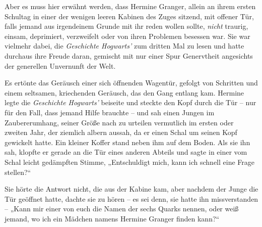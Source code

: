 Aber es muss hier erwähnt werden, dass Hermine Granger, allein an ihrem ersten Schultag in einer der wenigen leeren Kabinen des Zuges sitzend, mit offener Tür, falls jemand aus irgendeinem Grunde mit ihr reden wollen sollte, \emph{nicht} traurig, einsam, deprimiert, verzweifelt oder von ihren Problemen besessen war. Sie war vielmehr dabei, die \emph{Geschichte Hogwarts’} zum dritten Mal zu lesen und hatte durchaus ihre Freude daran, gemischt mit nur einer Spur Genervtheit angesichts der generellen Unvernunft der Welt.

Es ertönte das Geräusch einer sich öffnenden Wagentür, gefolgt von Schritten und einem seltsamen, kriechenden Geräusch, das den Gang entlang kam. Hermine legte die \emph{Geschichte Hogwarts’} beiseite und steckte den Kopf durch die Tür – nur für den Fall, dass jemand Hilfe brauchte – und sah einen Jungen im Zaubererumhang, seiner Größe nach zu urteilen vermutlich im ersten oder zweiten Jahr, der ziemlich albern aussah, da er einen Schal um seinen Kopf gewickelt hatte. Ein kleiner Koffer stand neben ihm auf dem Boden. Als sie ihn sah, klopfte er gerade an die Tür eines anderen Abteils und sagte in einer vom Schal leicht gedämpften Stimme, „Entschuldigt mich, kann ich schnell eine Frage stellen?“

Sie hörte die Antwort nicht, die aus der Kabine kam, aber nachdem der Junge die Tür geöffnet hatte, dachte sie zu hören – es sei denn, sie hatte ihn missverstanden – „Kann mir einer von euch die Namen der sechs Quarks nennen, oder weiß jemand, wo ich ein Mädchen namens Hermine Granger finden kann?“

